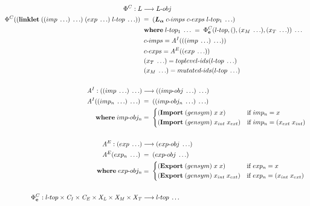 \documentclass[sigplan,screen,anonymous]{acmart}
\def\dash {\text{-}}
\begin{document}
\begin{figure*}[tbp]
  \small
  \begin{align*}
    \Phi^C : L &\longrightarrow L\dash obj \\
    \Phi^C((\textbf{linklet}\; ((imp\; \ldots)\; \ldots)\; (exp\; \ldots)\; l\dash top\; \ldots))\; &=\; (\la\; c\dash imps\; c\dash exps\; l\dash top_1\; \ldots) \\
    \;        &\; \where l\dash top_1\; \ldots\; =\; \Phi^C_{\textbf{e}}(l\dash top,(),(x_M\;\ldots),(x_T\;\ldots))\; \ldots \\
    \;        &\; c\dash imps = \mathit{A}^I(((imp\; \ldots)\; \ldots)) \\
    \;        &\; c\dash exps = \mathit{A}^E((exp\; \ldots)) \\
    \;        &\; (x_T\;\ldots) = toplevel\dash ids(l\dash top\; \ldots) \\
    \;        &\; (x_M\;\ldots) = mutated\dash ids(l\dash top\; \ldots) \\ \\
    \mathit{A}^I : ((imp\; \ldots)\; \ldots) &\longrightarrow ((imp\dash obj\; \ldots)\; \ldots) \\
    \mathit{A}^I((imp_n\; \ldots)\; \ldots)\; &=\; ((imp\dash obj_n\; \ldots)\; \ldots) \\
    \;   \where imp\dash obj_n  &=\; \begin{cases*}
      (\textbf{Import}\;(gensym)\;x\;x) & if $imp_n = x$ \\
      (\textbf{Import}\;(gensym)\;x_{int}\;x_{ext}) & if $imp_n = (x_{ext}\;x_{int})$ \\
    \end{cases*} \\ \\
    \mathit{A}^E : (exp\; \ldots) &\longrightarrow (exp\dash obj\; \ldots) \\
    \mathit{A}^E(exp_n\; \ldots)\; &=\; (exp\dash obj\; \ldots) \\
    \;   \where exp\dash obj_n  &=\; \begin{cases*}
      (\textbf{Export}\;(gensym)\;x\;x) & if $exp_n = x$ \\
      (\textbf{Export}\;(gensym)\;x_{int}\;x_{ext}) & if $exp_n = (x_{int}\;x_{ext})$ \\
    \end{cases*} \\ \\
    \Phi^C_{\textbf{e}} : l\dash top \times \mathit{C_I} \times \mathit{C_E} \times \mathit{X_L} \times\mathit{X_M} \times\mathit{X_T} &\longrightarrow l\dash top\; \ldots \\

\end{align*}
\end{figure*}
\end{document}
